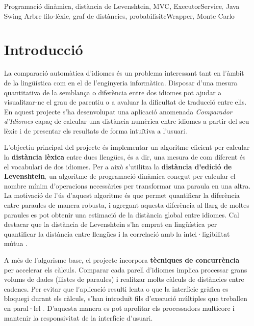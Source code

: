 \documentclass{ieeetj}
\begin{document}
\begin{IEEEkeywords}
Programació dinàmica, distància de Levenshtein, MVC, ExecutorService, Java Swing Arbre filo-lèxic, graf de distàncies, probabilisitcWrapper, Monte Carlo 
\end{IEEEkeywords}


\maketitle


\section{Introducció}
La comparació automàtica d’idiomes és un problema interessant tant en l’àmbit de la lingüística com en el de l’enginyeria informàtica. Disposar d’una mesura quantitativa de la semblança o diferència entre dos idiomes pot ajudar a visualitzar-ne el grau de parentiu o a avaluar la dificultat de traducció entre ells. En aquest projecte s’ha desenvolupat una aplicació anomenada \emph{Comparador d’Idiomes} capaç de calcular una distància numèrica entre idiomes a partir del seu lèxic i de presentar els resultats de forma intuïtiva a l’usuari.\newline

L’objectiu principal del projecte és implementar un algoritme eficient per calcular la \textbf{distància lèxica} entre dues llengües, és a dir, una mesura de com diferent és el vocabulari de dos idiomes. Per a això s’utilitza la \textbf{distància d’edició de Levenshtein}, un algoritme de programació dinàmica conegut per calcular el nombre mínim d’operacions necessàries per transformar una paraula en una altra. La motivació de l’ús d’aquest algoritme és que permet quantificar la diferència entre paraules de manera robusta, i agregant aquesta diferència al llarg de moltes paraules es pot obtenir una estimació de la distància global entre idiomes. Cal destacar que la distància de Levenshtein s’ha emprat en lingüística per quantificar la distància entre llengües i la correlació amb la intel·ligibilitat mútua \cite{levDistanceWiki}.\newline

A més de l’algorisme base, el projecte incorpora \textbf{tècniques de concurrència} per accelerar els càlculs. Comparar cada parell d’idiomes implica processar grans volums de dades (llistes de paraules) i realitzar molts càlculs de distàncies entre cadenes. 
Per evitar que l’aplicació resulti lenta o que la interfície gràfica es bloquegi durant els càlculs, s’han introduït fils d’execució múltiples que treballen en paral·lel \cite{oracleExecutorService}. D’aquesta manera es pot aprofitar els processadors multicore i mantenir la responsivitat de la interfície d’usuari.\newline
\end{document}

